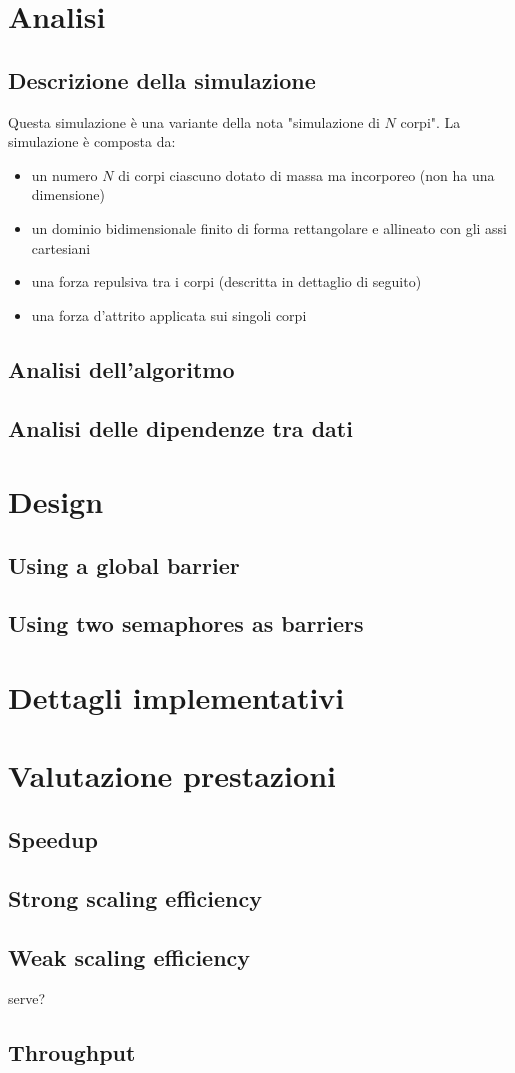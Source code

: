 \documentclass{article}
\begin{document}
	
	\tableofcontents
	\newpage
	
	\section{Analisi}
	\subsection{Descrizione della simulazione}
	Questa simulazione è una variante della nota "simulazione di $N$ corpi". La simulazione è composta da:
	\begin{itemize}
		\item un numero $N$ di corpi ciascuno dotato di massa ma incorporeo (non ha una dimensione)
		\item un dominio bidimensionale finito di forma rettangolare e allineato con gli assi cartesiani
		\item una forza repulsiva tra i corpi (descritta in dettaglio di seguito)
		\item una forza d'attrito applicata sui singoli corpi
	\end{itemize}
	
	\subsection{Analisi dell'algoritmo}
	\subsection{Analisi delle dipendenze tra dati}
	
	\section{Design}
	\subsection{Using a global barrier}
	\subsection{Using two semaphores as barriers}
	
	\section{Dettagli implementativi}
	
	\section{Valutazione prestazioni}
	\subsection{Speedup}
	\subsection{Strong scaling efficiency}
	\subsection{Weak scaling efficiency}
	serve?
	\subsection{Throughput}
\end{document}
